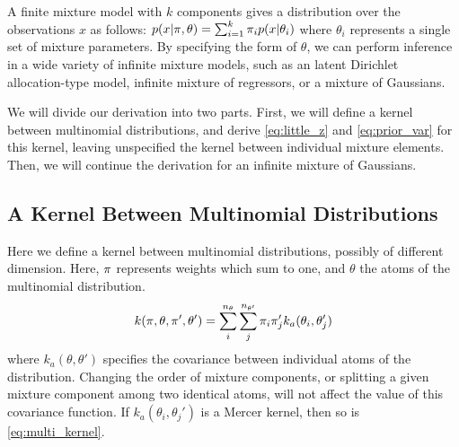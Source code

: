 A finite mixture model with $k$ components gives a distribution over the observations $x$ as follows:
%
$p(x | {\bf{\pi}}, {\bf{\theta}}) = \sum_{i = 1}^k \pi_i p\!\left(x\middle\vert\theta_i\right)$
%
where $\theta_i$ represents a single set of mixture parameters.  By specifying the form of $\theta$, we can perform inference in a wide variety of infinite mixture models, such as an latent Dirichlet allocation-type model, infinite mixture of regressors, or a mixture of Gaussians.

We will divide our derivation into two parts.  First, we will define a kernel between multinomial distributions, and derive \eqref{eq:little_z} and \eqref{eq:prior_var} for this kernel, leaving unspecified the kernel between individual mixture elements.  Then, we will continue the derivation for an infinite mixture of Gaussians.

\subsection{A Kernel Between Multinomial Distributions} 

Here we define a kernel between multinomial distributions, possibly of different dimension.  Here, ${\bf{\pi}}$ represents weights which sum to one, and $\theta$ the atoms of the multinomial distribution.
%
\begin{align}
k({\bf{\pi}}, {\bf{\theta}}, {\bf{\pi}}', {\bf{\theta}}') = \sum_i^{n_\theta} \sum_j^{n_{\theta'}} \pi_i \pi_j' k_a( \theta_i, \theta_j')
\label{eq:multi_kernel}
\end{align}
%
where $k_a( \theta, \theta')$ specifies the covariance between individual atoms of the distribution.  Changing the order of mixture components, or splitting a given mixture component among two identical atoms, will not affect the value of this covariance function.  If $k_a( \theta_i, \theta_j')$ is a Mercer kernel, then so is \eqref{eq:multi_kernel}.


